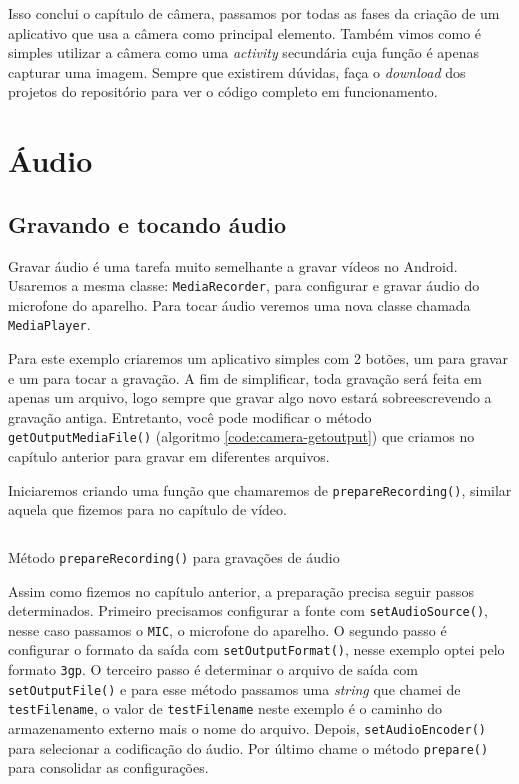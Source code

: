 \documentclass[a4paper,12pt,brazil]{book}
\begin{document}
\begin{singlespace}
		Isso conclui o capítulo de câmera, passamos por todas as fases da criação de um aplicativo que usa a câmera como principal elemento. Também vimos como é simples utilizar a câmera como uma \emph{activity} secundária cuja função é apenas capturar uma imagem. Sempre que existirem dúvidas, faça o \emph{download} dos projetos do repositório para ver o código completo em funcionamento.

\chapter{Áudio}
	\section{Gravando e tocando áudio}

		Gravar áudio é uma tarefa muito semelhante a gravar vídeos no Android. Usaremos a mesma classe: \texttt{MediaRecorder}, para configurar e gravar áudio do microfone do aparelho. Para tocar áudio veremos uma nova classe chamada \texttt{MediaPlayer}.

		Para este exemplo criaremos um aplicativo simples com 2 botões, um para gravar e um para tocar a gravação. A fim de simplificar, toda gravação será feita em apenas um arquivo, logo sempre que gravar algo novo estará sobreescrevendo a gravação antiga. Entretanto, você pode modificar o método \texttt{getOutputMediaFile()} (algoritmo \ref{code:camera-getoutput}) que criamos no capítulo anterior para gravar em diferentes arquivos.

		Iniciaremos criando uma função que chamaremos de \texttt{prepareRecording()}, similar aquela que fizemos para no capítulo de vídeo.

		\begin{listing}[H]
		\inputminted[linenos=true,fontsize=\small,frame=lines, framesep=2mm, tabsize=2,numbersep=5pt]{java}{src/api/audio/prepare.java}
		\caption{Método \texttt{prepareRecording()} para gravações de áudio}
		\label{code:audioprepare}
		\end{listing} 		

		Assim como fizemos no capítulo anterior, a preparação precisa seguir passos determinados. Primeiro precisamos configurar a fonte com \texttt{setAudioSource()}, nesse caso passamos o \texttt{MIC}, o microfone do aparelho. O segundo passo é configurar o formato da saída com \texttt{setOutputFormat()}, nesse exemplo optei pelo formato \texttt{3gp}. O terceiro passo é determinar o arquivo de saída com \texttt{setOutputFile()} e para esse método passamos uma \emph{string} que chamei de \texttt{testFilename}, o valor de \texttt{testFilename} neste exemplo é o caminho do armazenamento externo mais o nome do arquivo. Depois, \texttt{setAudioEncoder()} para selecionar a codificação do áudio. Por último chame o método \texttt{prepare()} para consolidar as configurações.


\end{singlespace}
\end{document}
